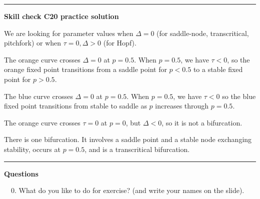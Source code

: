\documentclass[12pt,letterpaper,noanswers]{exam}
\begin{document}
\vspace{0.2cm}

\hrule
\vspace{0.2cm}

\noindent\textbf{Skill check C20 practice solution}

We are looking for parameter values when $\Delta = 0$ (for saddle-node, transcritical, pitchfork) or when $\tau = 0, \Delta>0$ (for Hopf).

The orange curve crosses $\Delta = 0$ at $p=0.5$.  When $p=0.5$, we have $\tau < 0$, so the orange fixed point transitions from a saddle point for $p<0.5$ to a stable fixed point for $p>0.5$.

The blue curve crosses $\Delta = 0$ at $p = 0.5$.  When $p=0.5$, we have $\tau<0$ so the blue fixed point transitions from stable to saddle as $p$ increases through $p=0.5$.

The orange curve crosses $\tau = 0$ at $p=0$, but $\Delta<0$, so it is not a bifurcation.

There is one bifurcation.  It involves a saddle point and a stable node exchanging stability, occurs at $p=0.5$, and is a transcritical bifurcation.

\vspace{0.2cm}

\hrule
\vspace{0.2cm}
\noindent\textbf{Questions}

\noindent \ \ 0.  What do you like to do for exercise? (and write your names on the slide).
\end{document}
